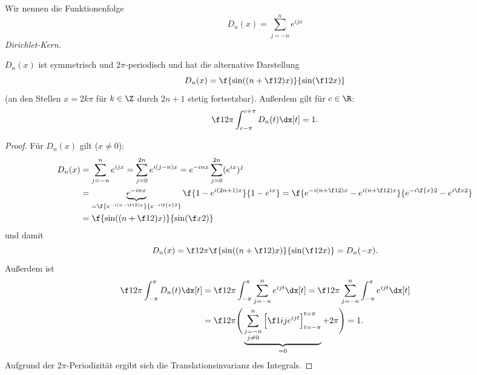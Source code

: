 \begin{nt*}
	Wir nennen die Funktionenfolge
	\[
		D_n(x) = \sum_{j=-n}^n e^{ijx}
	\]
	\emph{Dirichlet-Kern}.

	$D_n(x)$ ist symmetrisch und $2\pi$-periodisch und hat die alternative Darstellung
	\[
		D_n(x) = \f {\sin((n+\f 12)x)}{\sin(\f 12 x)}
	\]
	(an den Stellen $x = 2k\pi$ für $k \in \Z$ durch $2n + 1$ stetig fortsetzbar).
	Außerdem gilt für $c \in \R$:
	\begin{align*}
		\f 1{2\pi} \int_{c-\pi}^{c+\pi} D_n(t) \dx[t] = 1.
	\end{align*}
	\begin{proof}
		Für $D_n(x)$ gilt ($x \neq 0$):
		\begin{align*}
			D_n(x)
			&= \sum_{j=-n}^n e^{ijx}
			= \sum_{j=0}^{2n} e^{i(j-n)x}
			= e^{-inx} \sum_{j=0}^{2n} (e^{ix})^{j} \\
			&= \underbrace{e^{-inx}}_{= \f {e^{-i(n-\f 12)x}}{e^{-i \f{x}2}}} \f {1- e^{i(2n+1)x}}{1- e^{ix}}
			= \f {e^{-i(n+\f 12)x} - e^{i (n+\f 12)x}}{e^{-i\f{x}2}-e^{i \f x 2}} \\
			&= \f {\sin((n+ \f 12)x)}{\sin(\f x 2)}
		\end{align*}
		und damit
		\[
			D_n(x) = \f 1{2\pi} \f {\sin((n+\f 12)x)}{\sin(\f 12 x)} = D_n(-x).
		\]
		Außerdem ist
		\begin{align*}
			\f 1{2\pi} \int_{-\pi}^\pi D_n(t) \dx[t]
			&= \f 1{2\pi} \int_{-\pi}^\pi \sum_{j=-n}^n e^{ijt} \dx[t]
			= \f 1{2\pi} \sum_{j=-n}^n \int_{-\pi}^\pi e^{ijt} \dx[t] \\
			&= \f 1{2\pi} \Bigg( \underbrace{\sum_{\substack{j=-n \\ j\neq 0}}^n \Big[ \f 1{ij} e^{ijt} \Big]_{t=-\pi}^{t=\pi}}_{= 0} + 2\pi \Bigg)
			= 1.
		\end{align*}
		Aufgrund der $2\pi$-Periodizität ergibt sich die Translationsinvarianz des Integrals.
	\end{proof}
\end{nt*}

